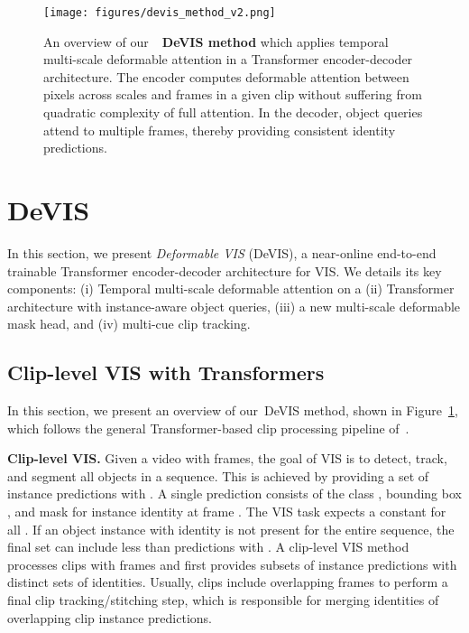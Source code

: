 \documentclass[runningheads]{llncs}
\newcommand{\evis}{\mbox{DeVIS}}
\begin{document}
%
 \begin{figure}[t]
    \centering
    \texttt{[image: figures/devis\_method\_v2.png]}
\caption{
An overview of our~\textbf{~\evis{} method} which applies temporal multi-scale deformable attention in a Transformer encoder-decoder architecture.
The encoder computes deformable attention between pixels across scales and frames in a given clip without suffering from quadratic complexity of full attention.
In the decoder, object queries attend to multiple frames, thereby providing consistent identity predictions.
    }
    \label{fig:method}
\end{figure} 
\section{\evis{}}
In this section, we present \textit{Deformable VIS} (\evis{}), a near-online end-to-end trainable Transformer encoder-decoder architecture for VIS.
We details its key components: (i) Temporal multi-scale deformable attention on a (ii) Transformer architecture with instance-aware object queries, (iii) a new multi-scale deformable mask head, and (iv) multi-cue clip tracking.

\subsection{Clip-level VIS with Transformers}
\label{sec:clip_level_vis_trans}

In this section, we present an overview of our~\evis{} method, shown in Figure~\ref{fig:method}, which follows the general Transformer-based clip processing pipeline of~\cite{vistr}.

\noindent \textbf{Clip-level VIS.} Given a video with  frames, the goal of VIS is to detect, track, and segment all  objects in a sequence.
This is achieved by providing a set of instance predictions  with .
A single prediction consists of the class , bounding box , and mask  for instance identity  at frame .
The VIS task expects a constant  for all .
If an object instance with identity  is not present for the entire sequence, the final set  can include less than  predictions with .
A clip-level VIS method processes clips with  frames and first provides subsets of instance predictions  with distinct sets of identities.
Usually, clips include overlapping frames to perform a final clip tracking/stitching step, which is responsible for merging identities of overlapping clip instance predictions.
\end{document}

